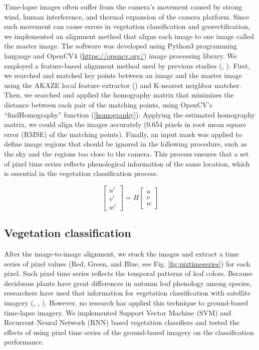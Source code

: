 \documentclass{article}
\begin{document}
Time-lapse images often suffer from the camera's movement caused by strong wind, human interference, and thermal expansion of the camera platform. Since such movement can cause errors in vegetation classification and georectification, we implemented an alignment method that aligns each image to one image called the master image. The software was developed using Python3 programming language and OpenCV4 (\url{https://opencv.org/}) image processing library. We employed a feature-based alignment method used by previous studies (\cite{Hulton2020PyTrx}, \cite{Portenier2020Cryosphere}). First, we searched and matched key points between an image and the master image using the AKAZE local feature extractor (\cite{Alcantarilla2013AKAZE}) and K-nearest neighbor matcher. Then, we searched and applied the homography matrix that minimizes the distance between each pair of the matching points, using OpenCV's ``findHomography'' function (\ref{homography}). Applying the estimated homography matrix, we could align the images accurately (0.654 pixels in root mean square error (RMSE) of the matching points). Finally, an input mask was applied to define image regions that should be ignored in the following procedure, such as the sky and the regions too close to the camera. This process ensures that a set of pixel time series reflects phenological information of the same location, which is essential in the vegetation classification process.



\label{homography}
\begin{equation}
  \begin{bmatrix} 
    u' \\ v' \\ w'
  \end{bmatrix}
  =
  H
  \begin{bmatrix} 
    u \\ v \\ w 
  \end{bmatrix}
\end{equation}

\hypertarget{vegetation-classification}{%
\subsection{Vegetation classification}\label{vegetation-classification}}

After the image-to-image alignment, we stuck the images and extract a time series of pixel values (Red, Green, and Blue, see Fig. \ref{fig:pixtimeseries}) for each pixel. Such pixel time series reflects the temporal patterns of leaf colors. Because deciduous plants have great differences in autumn leaf phenology among species, researchers have used that information for vegetation classification with satellite imagery (\cite{Son2013RemSen}, \cite{Tigges2013RemSenEnv}, \cite{Heupel2018PFG}). However, no research has applied this technique to ground-based time-lapse imagery. We implemented Support Vector Machine (SVM) and Recurrent Neural Network (RNN) based vegetation classifiers and tested the effects of using pixel time series of the ground-based imagery on the classification performance.
\end{document}
